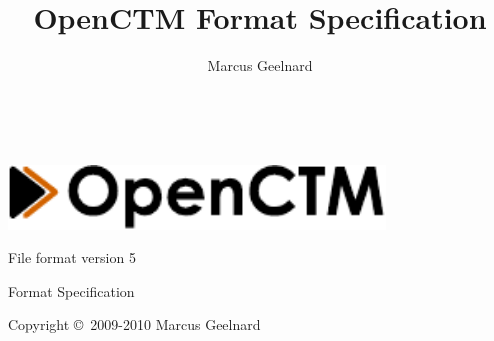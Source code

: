 %
%



\author{Marcus Geelnard}
\title{OpenCTM Format Specification}





\begin{titlepage}
\begin{center}
~
\vspace{5cm}

\includegraphics[width=10.0cm]{logo.pdf}
\vspace{0.4cm}

{\large File format version 5}

\vspace{1.0cm}

{\Large Format Specification}
\vspace{1.5cm}

Copyright \copyright \ 2009-2010 Marcus Geelnard
\end{center}
\end{titlepage}



